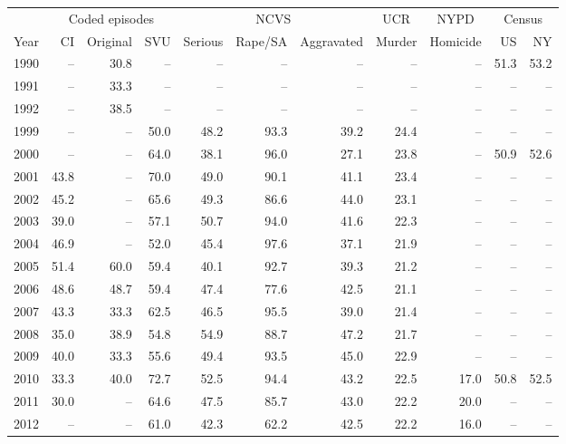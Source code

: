 \begin{center}
\label{tab:v_sex}
\small
\setlength{\tabcolsep}{2.5pt}
\renewcommand{\arraystretch}{1.08}
\begin{tabular}{@{}rrrrrrrrrrr@{}}
\toprule
 & \multicolumn{3}{c}{Coded episodes} & \multicolumn{3}{c}{NCVS} & \multicolumn{1}{c}{UCR} & \multicolumn{1}{c}{NYPD} & \multicolumn{2}{c}{Census} \\
\cmidrule(lr){2-4}
\cmidrule(lr){5-7}
\cmidrule(lr){8-8}
\cmidrule(lr){9-9}
\cmidrule(lr){10-11}
Year & CI & Original & SVU & Serious & Rape/SA & Aggravated & Murder & Homicide & US & NY \\
\midrule
1990 & -- & 30.8 & -- & -- & -- & -- & -- & -- & 51.3 & 53.2 \\
1991 & -- & 33.3 & -- & -- & -- & -- & -- & -- & -- & -- \\
1992 & -- & 38.5 & -- & -- & -- & -- & -- & -- & -- & -- \\
1999 & -- & -- & 50.0 & 48.2 & 93.3 & 39.2 & 24.4 & -- & -- & -- \\
2000 & -- & -- & 64.0 & 38.1 & 96.0 & 27.1 & 23.8 & -- & 50.9 & 52.6 \\
2001 & 43.8 & -- & 70.0 & 49.0 & 90.1 & 41.1 & 23.4 & -- & -- & -- \\
2002 & 45.2 & -- & 65.6 & 49.3 & 86.6 & 44.0 & 23.1 & -- & -- & -- \\
2003 & 39.0 & -- & 57.1 & 50.7 & 94.0 & 41.6 & 22.3 & -- & -- & -- \\
2004 & 46.9 & -- & 52.0 & 45.4 & 97.6 & 37.1 & 21.9 & -- & -- & -- \\
2005 & 51.4 & 60.0 & 59.4 & 40.1 & 92.7 & 39.3 & 21.2 & -- & -- & -- \\
2006 & 48.6 & 48.7 & 59.4 & 47.4 & 77.6 & 42.5 & 21.1 & -- & -- & -- \\
2007 & 43.3 & 33.3 & 62.5 & 46.5 & 95.5 & 39.0 & 21.4 & -- & -- & -- \\
2008 & 35.0 & 38.9 & 54.8 & 54.9 & 88.7 & 47.2 & 21.7 & -- & -- & -- \\
2009 & 40.0 & 33.3 & 55.6 & 49.4 & 93.5 & 45.0 & 22.9 & -- & -- & -- \\
2010 & 33.3 & 40.0 & 72.7 & 52.5 & 94.4 & 43.2 & 22.5 & 17.0 & 50.8 & 52.5 \\
2011 & 30.0 & -- & 64.6 & 47.5 & 85.7 & 43.0 & 22.2 & 20.0 & -- & -- \\
2012 & -- & -- & 61.0 & 42.3 & 62.2 & 42.5 & 22.2 & 16.0 & -- & -- \\

\end{tabular}
\end{center}

